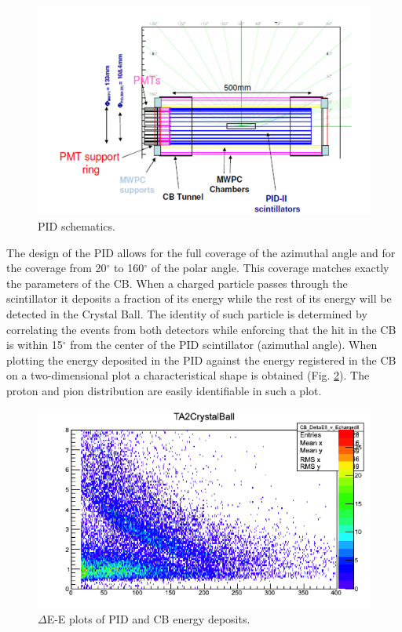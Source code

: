 \begin{figure}[H]
\begin{center}
\includegraphics[scale=0.55]{pictures/png/pidschematics.png}
\caption{PID schematics.}
\label{pid}
\end{center}
\end{figure}

\indent The design of the PID allows for the full coverage of the azimuthal angle and for the coverage from 20$^{\circ}$ to 160$^{\circ}$ of the polar angle. This coverage matches exactly the parameters of the CB. When  a  charged  particle  passes  through  the  scintillator  it  deposits  a fraction of its energy while the rest of its energy will be detected in the Crystal Ball. The identity  of  such  particle  is  determined  by  correlating  the  events  from  both detectors while enforcing that the hit in the CB is within 15$^{\circ}$ from the center of the PID scintillator (azimuthal angle). When plotting the energy deposited in the PID against the energy registered in the CB on a two-dimensional plot a characteristical shape is obtained (Fig. \ref{banana}). The proton and pion distribution are easily identifiable in such a plot.

\begin{figure}[H]
\begin{center}
\includegraphics[scale=1.0]{pictures/png/banana.png}
\caption{$\Delta$E-E plots of PID and CB energy deposits.}
\label{banana}
\end{center}
\end{figure}

